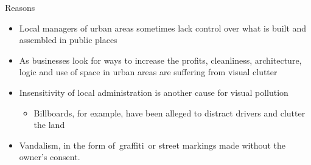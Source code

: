 \documentclass{beamer}
\begin{document}
     \begin{frame}{Reasons}
         \begin{itemize}
             \item Local managers of urban areas sometimes lack control over what is built and assembled in public places
             \item As businesses look for ways to increase the profits, cleanliness, architecture, logic and 
             use of space in urban areas are suffering from visual clutter
            \item Insensitivity of local administration is another cause for visual pollution
            \begin{itemize}
                \item Billboards, for example, have been alleged to distract drivers and clutter the land
            \end{itemize}
            \item Vandalism, in the form of graffiti or street markings made without the owner's consent.
         \end{itemize}
     \end{frame}
\end{document}
